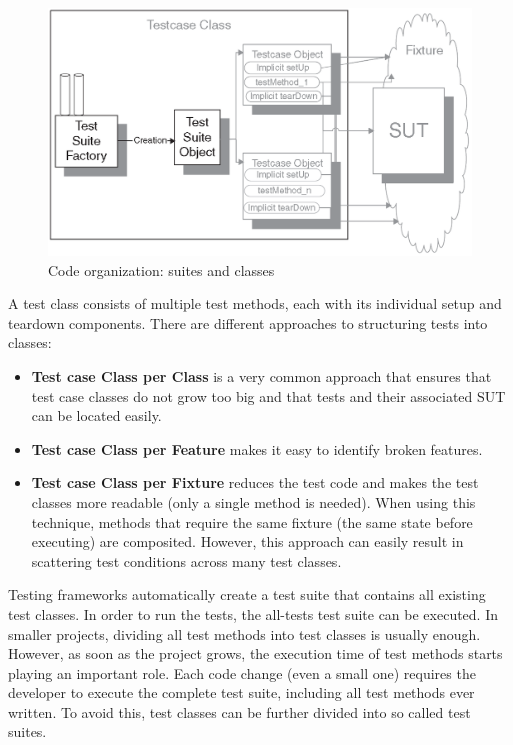         \begin{figure}[hbtp]
            \centering
            \includegraphics[width=\columnwidth]{img/organisation_big.png}
            \caption{Code organization: suites and classes \\ \cite[Chapter 24]{Meszaros:2006:XTP:1076526}}
            \label{fig:TestClassAndSuiteOrganization}
        \end{figure}

        A test class consists of multiple test methods, each with its individual setup and teardown components.
        There are different approaches to structuring tests into classes:

        \begin{itemize}
            \item \textbf{Test case Class per Class}
                    is a very common approach that ensures that test case classes do not grow too big and that tests and their associated SUT can be located easily.
            \item \textbf{Test case Class per Feature}
                    makes it easy to identify broken features.
            \item \textbf{Test case Class per Fixture}
                    reduces the test code and makes the test classes more readable (only a single  method is needed).
                    When using this technique, methods that require the same fixture (the same state before executing) are composited.
                    However, this approach can easily result in scattering test conditions across many test classes.
        \end{itemize}

        Testing frameworks automatically create a test suite that contains all existing test classes. In order to run the tests, the all-tests test suite can be executed.
        In smaller projects, dividing all test methods into test classes is usually enough.
        However, as soon as the project grows, the execution time of test methods starts playing an important role.
        Each code change (even a small one) requires the developer to execute the complete test suite, including all test methods ever written.
        To avoid this, test classes can be further divided into so called test suites.

